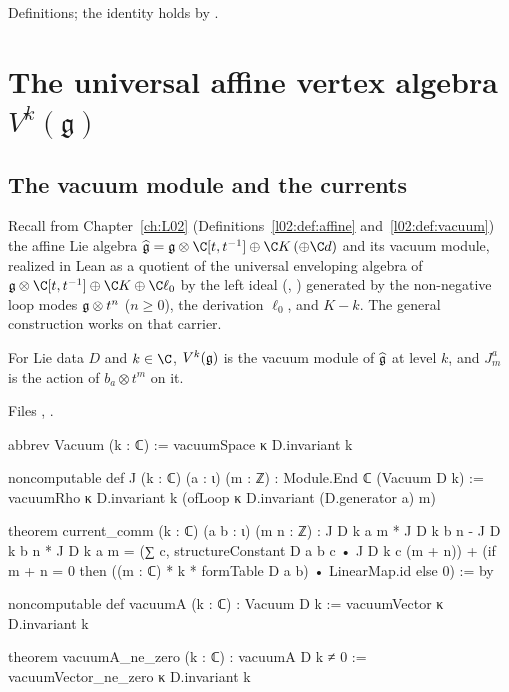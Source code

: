 \begin{status}
Definitions; the identity  holds by .
\end{status}

\section{The universal affine vertex algebra \texorpdfstring{$V^k(\mathfrak g)$}{V\^{}k(g)}}\label{l23:sec:universal}

\subsection{The vacuum module and the currents}

Recall from Chapter~\ref{ch:L02} (Definitions~\ref{l02:def:affine} and~\ref{l02:def:vacuum}) the affine Lie algebra
$\widehat{\lxxiiig}=\lxxiiig\otimes\C[t,t^{-1}]\oplus\C K\,(\oplus\C d)$ and its vacuum module, realized in Lean as a
quotient of the universal enveloping algebra of $\lxxiiig\otimes\C[t,t^{-1}]\oplus\C K\oplus\C\ell_0$ by the left ideal
(, ) generated by the non-negative loop modes
$\mathfrak g\otimes t^{n}$ ($n\ge0$), the derivation $\ell_0$, and $K-k$. The general construction works on that carrier.

\begin{definition}\label{l23:def:vacuum}
For Lie data $D$ and $k\in\C$, $V^k(\mathfrak g)$ is the vacuum module of $\widehat{\mathfrak g}$ at level $k$, and $J^a_m$ is the
action of $b_a\otimes t^m$ on it.
\end{definition}
\noindent Files ,
.
\begin{leancode}
abbrev Vacuum (k : ℂ) := vacuumSpace κ D.invariant k

noncomputable def J (k : ℂ) (a : ι) (m : ℤ) : Module.End ℂ (Vacuum D k) :=
  vacuumRho κ D.invariant k (ofLoop κ D.invariant (D.generator a) m)

theorem current_comm (k : ℂ) (a b : ι) (m n : ℤ) :
    J D k a m * J D k b n - J D k b n * J D k a m
      = (∑ c, structureConstant D a b c • J D k c (m + n))
        + (if m + n = 0 then ((m : ℂ) * k * formTable D a b) • LinearMap.id else 0) := by

noncomputable def vacuumA (k : ℂ) : Vacuum D k :=
  vacuumVector κ D.invariant k

theorem vacuumA_ne_zero (k : ℂ) : vacuumA D k ≠ 0 :=
  vacuumVector_ne_zero κ D.invariant k
\end{leancode}

